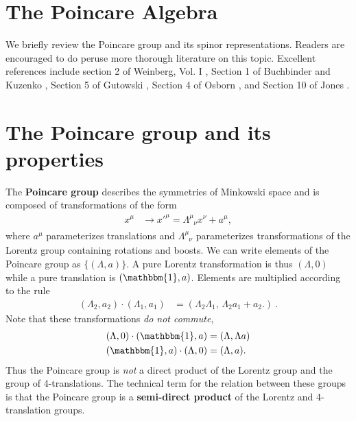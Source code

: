 \documentclass[12pt]{article}
\numberwithin{equation}{section}    %
\begin{document}




\section{The Poincare Algebra}
\label{sec:Poincare:Algebra}
% 
We briefly review the Poincare group and its spinor representations. 
%
Readers are encouraged to do peruse more thorough literature on this topic. Excellent references include section 2 of Weinberg, Vol. I \cite{weinberg}, Section 1 of Buchbinder and Kuzenko \cite{Buchbinder:1998qv}, Section 5 of Gutowski \cite{gutowski}, Section 4 of Osborn \cite{Osborn:Symmetries}, and Section 10 of Jones \cite{JonesGroups}. 


\section{The Poincare group and its properties}

The \textbf{Poincare group} describes the symmetries of Minkowski space and is composed of transformations of the form
\begin{align}
	x^\mu &\rightarrow x'^\mu = \Lambda^\mu_{\phantom{\mu}\nu} x^\nu + a^\mu,
\end{align}
where $a^\mu$ parameterizes translations and $\Lambda^\mu_{\phantom{\mu}\nu}$ parameterizes transformations of the Lorentz group  containing rotations and boosts. 
%
We can write elements of the Poincare group as $\{(\Lambda,a)\}$. A pure Lorentz transformation is thus $(\Lambda,0)$ while a pure translation is $(\mathbbm{1},a)$. 
%
Elements are multiplied according to the rule
\begin{align}
	(\Lambda_2, a_2) \cdot (\Lambda_1, a_1) 
	&= (\Lambda_2\Lambda_1,\,\Lambda_2 a_1 + a_2.) \ .
	\label{eq:SUSYalg:Poincare:multiplication}
\end{align}
%
Note that these transformations \textit{do not commute},
\begin{align}
	(\Lambda,0)\cdot (\mathbbm{1},a) &= (\Lambda,\Lambda a)\\
	(\mathbbm{1},a)\cdot(\Lambda,0) &= (\Lambda,a).
\end{align}
Thus the Poincare group is \textit{not} a direct product of the Lorentz group and the group of 4-translations. The technical term for the relation between these groups is that the Poincare group is a \textbf{semi-direct product} of the Lorentz and 4-translation groups.
\end{document}
